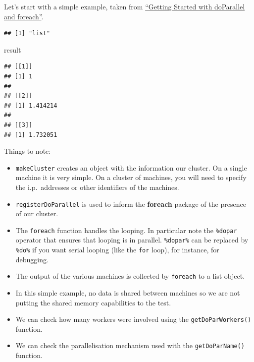 \documentclass[]{book}
\newenvironment{Shaded}{\begin{snugshade}}{\end{snugshade}}
\newcommand{\KeywordTok}[1]{\textcolor[rgb]{0.13,0.29,0.53}{\textbf{#1}}}
\newcommand{\DataTypeTok}[1]{\textcolor[rgb]{0.13,0.29,0.53}{#1}}
\newcommand{\DecValTok}[1]{\textcolor[rgb]{0.00,0.00,0.81}{#1}}
\newcommand{\StringTok}[1]{\textcolor[rgb]{0.31,0.60,0.02}{#1}}
\newcommand{\OperatorTok}[1]{\textcolor[rgb]{0.81,0.36,0.00}{\textbf{#1}}}
\newcommand{\NormalTok}[1]{#1}
\providecommand{\tightlist}{%
  \setlength{\itemsep}{0pt}\setlength{\parskip}{0pt}}
\theoremstyle{definition}
\theoremstyle{definition}
\theoremstyle{definition}
\theoremstyle{remark}
\begin{document}
Let's start with a simple example, taken from
\href{http://debian.mc.vanderbilt.edu/R/CRAN/web/packages/doParallel/vignettes/gettingstartedParallel.pdf}{``Getting
Started with doParallel and foreach''}.

\begin{Shaded}
\end{Shaded}

\begin{verbatim}
## [1] "list"
\end{verbatim}

\begin{Shaded}
\begin{Highlighting}[]
\NormalTok{result}
\end{Highlighting}
\end{Shaded}

\begin{verbatim}
## [[1]]
## [1] 1
## 
## [[2]]
## [1] 1.414214
## 
## [[3]]
## [1] 1.732051
\end{verbatim}

Things to note:

\begin{itemize}
\tightlist
\item
  \texttt{makeCluster} creates an object with the information our
  cluster. On a single machine it is very simple. On a cluster of
  machines, you will need to specify the i.p.~addresses or other
  identifiers of the machines.
\item
  \texttt{registerDoParallel} is used to inform the \textbf{foreach}
  package of the presence of our cluster.
\item
  The \texttt{foreach} function handles the looping. In particular note
  the \texttt{\%dopar} operator that ensures that looping is in
  parallel. \texttt{\%dopar\%} can be replaced by \texttt{\%do\%} if you
  want serial looping (like the \texttt{for} loop), for instance, for
  debugging.
\item
  The output of the various machines is collected by \texttt{foreach} to
  a list object.
\item
  In this simple example, no data is shared between machines so we are
  not putting the shared memory capabilities to the test.
\item
  We can check how many workers were involved using the
  \texttt{getDoParWorkers()} function.
\item
  We can check the parallelisation mechanism used with the
  \texttt{getDoParName()} function.
\end{itemize}
\end{document}
